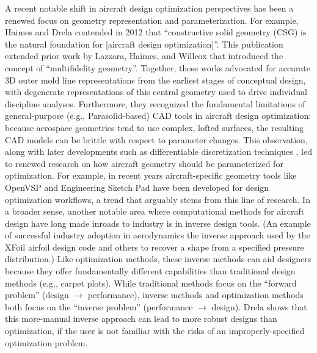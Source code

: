 \documentclass[12pt,vi,oneside,table]{report}
\begin{document}


    A recent notable shift in aircraft design optimization perspectives has been a renewed focus on geometry representation and parameterization. For example, Haimes and Drela \cite{haimes_construction_2012} contended in 2012 that ``constructive solid geometry (CSG) is the natural foundation for [aircraft design optimization]''. This publication extended prior work by Lazzara, Haimes, and Willcox \cite{lazzara_haimes_willcox_multifidelity_geometry_2009} that introduced the concept of ``multifidelity geometry''. Together, these works advocated for accurate 3D outer mold line representations from the earliest stages of conceptual design, with degenerate representations of this central geometry used to drive individual discipline analyses. Furthermore, they recognized the fundamental limitations of general-purpose (e.g., Parasolid-based) CAD tools in aircraft design optimization: because aerospace geometries tend to use complex, lofted surfaces, the resulting CAD models can be brittle with respect to parameter changes. This observation, along with later developments such as differentiable discretization techniques \cite{esp}, led to renewed research on how aircraft geometry should be parameterized for optimization. For example, in recent years aircraft-specific geometry tools like OpenVSP \cite{mcdonald_open_2022} and Engineering Sketch Pad \cite{esp} have been developed for design optimization workflows, a trend that arguably stems from this line of research.
    In a broader sense, another notable area where computational methods for aircraft design have long made inroads to industry is in inverse design tools. (An example of successful industry adoption in aerodynamics the inverse approach used by the XFoil airfoil design code \cite{drela_xfoil_1989} and others \cite{liebeck_blendedwingbody_1998} to recover a shape from a specified pressure distribution.) Like optimization methods, these inverse methods can aid designers because they offer fundamentally different capabilities than traditional design methods (e.g., carpet plots). While traditional methods focus on the ``forward problem'' (design $\rightarrow$ performance), inverse methods and optimization methods both focus on the ``inverse problem'' (performance $\rightarrow$ design). Drela \cite{drela_pros_1998} shows that this more-manual inverse approach can lead to more robust designs than optimization, if the user is not familiar with the risks of an improperly-specified optimization problem.
\end{document}
